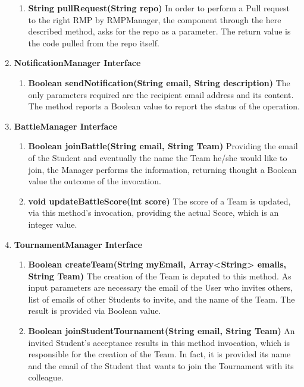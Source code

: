 \begin{enumerate}
        \begin{enumerate}[label=$\bullet$]
            \item \textbf{String pullRequest(String repo)} In order to perform a Pull request to the right RMP by RMPManager, the component through the here described method, asks for the repo as a parameter. The return value is the 
            code pulled from the repo itself.
        \end{enumerate} 
    \item \textbf{NotificationManager Interface}
        \begin{enumerate}[label=$\bullet$]
            \item \textbf{Boolean sendNotification(String email, String description)} The only parameters required are the recipient email address and its content. The method reports a Boolean value to report the status of the operation.
        \end{enumerate}
    \item \textbf{BattleManager Interface}
        \begin{enumerate}[label=$\bullet$]
            \item \textbf{Boolean joinBattle(String email, String Team)} Providing the email of the Student and eventually the name the Team he/she would like to join, the Manager performs the information, returning thought a Boolean 
            value the outcome of the invocation.
            \item \textbf{void updateBattleScore(int score)} The score of a Team is updated, via this method's invocation, providing the actual Score, which is an integer value.
        \end{enumerate}
    \item \textbf{TournamentManager Interface}
        \begin{enumerate}[label=$\bullet$]
        \item \textbf{Boolean createTeam(String myEmail, Array<String> emails, String Team)} The creation of the Team is deputed to this method. As input parameters are necessary the email of the User who invites others, list of emails 
        of other Students to invite, and the name of the Team. The result is provided via Boolean value. 
        \item \textbf{Boolean joinStudentTournament(String email, String Team)} An invited Student's acceptance results in this method invocation, which is responsible for the creation of the Team. In fact, it is provided its name and 
        the email of the Student that wants to join the Tournament with its colleague.

\end{enumerate}
\end{enumerate}
